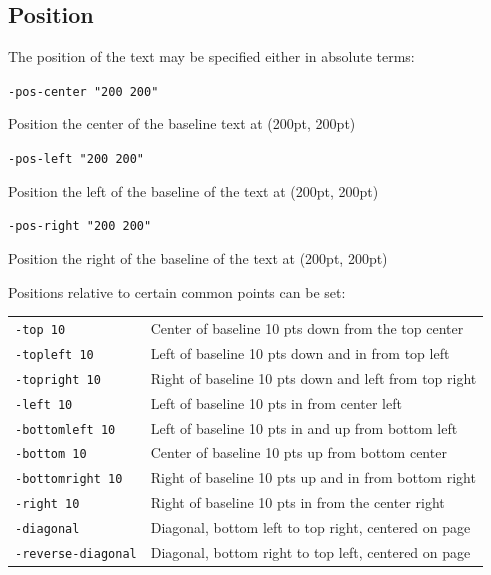 \documentclass[a4paper,makeidx]{memoir}
\begin{document}
  \subsection{Position}
  \label{position}
  The position of the text may be specified either in absolute terms:
  \begin{framed}
    \small\verb!-pos-center "200 200"!
  
    \vspace{2.5mm}
    \noindent Position the center of the baseline text at (200pt, 200pt)

    \vspace{2.5mm}
    \small\verb!-pos-left "200 200"!
  
    \vspace{2.5mm}
    \noindent Position the left of the baseline of the text at (200pt, 200pt)

    \vspace{2.5mm}
    \small\verb!-pos-right "200 200"!
  
    \vspace{2.5mm}
    \noindent Position the right of the baseline of the text at (200pt, 200pt)

  \end{framed}

  \noindent Positions relative to certain common points can be set:

  \begin{framed}
    \noindent\begin{tabular}{ll}
      \small\verb!-top 10! & Center of baseline 10 pts down from the top center \\
      \small\verb!-topleft 10! & Left of baseline 10 pts down and in from top left \\
      \small\verb!-topright 10! & Right of baseline 10 pts down and left from top right\\
      \small\verb!-left 10! & Left of baseline 10 pts in from center left \\
      \small\verb!-bottomleft 10! & Left of baseline 10 pts in and up from bottom left \\
      \small\verb!-bottom 10! & Center of baseline 10 pts up from bottom center\\
      \small\verb!-bottomright 10! & Right of baseline 10 pts up and in from bottom right \\
      \small\verb!-right 10! & Right of baseline 10 pts in from the center right \\
      \small\verb!-diagonal! & Diagonal, bottom left to top right, centered on page\\
      \small\verb!-reverse-diagonal! & Diagonal, bottom right to top left, centered on page\\
    \end{tabular}
  \end{framed}
\end{document}
